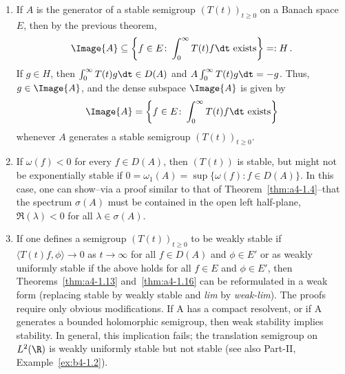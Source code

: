 \begin{remark}\label{rem:a4-1.17}
\begin{enumerate}[\upshape (i), wide, labelindent=.25em]
\item 
If\/ $A$ is the generator of a stable semigroup
$(T(t))_{t \geq 0}$ on a Banach space $E$, then by the previous theorem,
\[{
\Image{A} \subseteq \left\{f \in E\colon\int_{0}^{\infty} T(t)f  \dt 
\text{ exists} \right\} =: H\,.
}
\]
If\/ $g \in H$, then $\int_{0}^{\infty} T(t)g  \dt \in D(A)$ and $A \int_{0}^{\infty} T(t)g  \dt = -g$. 
Thus, $g \in \Image{A}$, and  the dense subspace $\Image{A}$ is given
by
\begin{equation}\label{eq:a4-1.14}
\Image{A} = \left\{f \in E\colon\int_{0}^{\infty} T(t)f  \dt \text{ exists} \right\}
\end{equation}
whenever $A$ generates a stable semigroup $(T(t))_{t \geq 0}$.

\item 
If\/ $\omega(f) < 0$ for every $f \in D(A)$, then $(T(t))$ is stable, but
might not be exponentially stable if
$0 = \omega_{1}(A) = \sup\{\omega(f) \colon f \in D(A)\}$.
In this case, one can show--via a
proof similar to that of Theorem~\ref{thm:a4-1.4}--that the spectrum $\sigma(A)$ must be contained
in the open left half-plane, \ie $\Re(\lambda) < 0$ for all $\lambda \in \sigma(A)$.

\item 
If one defines a semigroup $(T(t))_{t \geq 0}$ to be weakly stable if
$\langle T(t)f,\phi \rangle \to 0$ as $t \to \infty$ for all $f \in D(A)$ and $\phi \in E'$ or as
weakly uniformly stable if the above holds  for all $f \in E$
and $\phi \in E'$, then Theorems~\ref{thm:a4-1.13} and~\ref{thm:a4-1.16} can be reformulated in a weak form (\ie  replacing stable by weakly stable and \emph{lim} by
\emph{weak-lim}). 
The proofs require only obvious modifications.
If A has a compact resolvent, or if A generates a bounded
holomorphic semigroup, then weak stability implies stability. 
In general, this implication fails; \eg the translation semigroup on
$L^{2}(\R)$ is weakly uniformly stable but not stable (see also Part-II, Example~\ref{ex:b4-1.2}).
\end{enumerate}
\end{remark}
